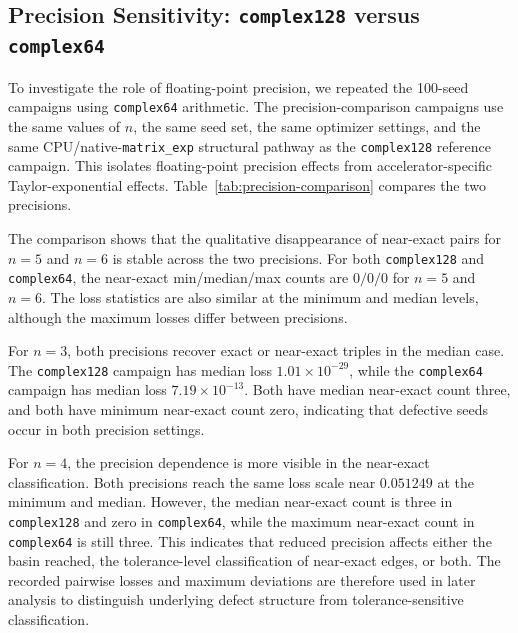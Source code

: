 \documentclass[a4paper,twocolumn,11pt,amsfonts,amssymb]{quantumarticle}
\begin{document}
\subsection{\texorpdfstring{Precision Sensitivity: \texttt{complex128} versus \texttt{complex64}}{Precision Sensitivity: complex128 versus complex64}}
\label{subsec:precision-sensitivity}

To investigate the role of floating-point precision, we repeated the 100-seed campaigns using \texttt{complex64} arithmetic. The precision-comparison campaigns use the same values of \(n\), the same seed set, the same optimizer settings, and the same CPU/native-\texttt{matrix\_exp} structural pathway as the \texttt{complex128} reference campaign. This isolates floating-point precision effects from accelerator-specific Taylor-exponential effects. Table~\ref{tab:precision-comparison} compares the two precisions.

The comparison shows that the qualitative disappearance of near-exact pairs for \(n=5\) and \(n=6\) is stable across the two precisions. For both \texttt{complex128} and \texttt{complex64}, the near-exact min/median/max counts are \(0/0/0\) for \(n=5\) and \(n=6\). The loss statistics are also similar at the minimum and median levels, although the maximum losses differ between precisions.

For \(n=3\), both precisions recover exact or near-exact triples in the median case. The \texttt{complex128} campaign has median loss \(1.01\times 10^{-29}\), while the \texttt{complex64} campaign has median loss \(7.19\times 10^{-13}\). Both have median near-exact count three, and both have minimum near-exact count zero, indicating that defective seeds occur in both precision settings.

For \(n=4\), the precision dependence is more visible in the near-exact classification. Both precisions reach the same loss scale near \(0.051249\) at the minimum and median. However, the median near-exact count is three in \texttt{complex128} and zero in \texttt{complex64}, while the maximum near-exact count in \texttt{complex64} is still three. This indicates that reduced precision affects either the basin reached, the tolerance-level classification of near-exact edges, or both. The recorded pairwise losses and maximum deviations are therefore used in later analysis to distinguish underlying defect structure from tolerance-sensitive classification.
\end{document}
